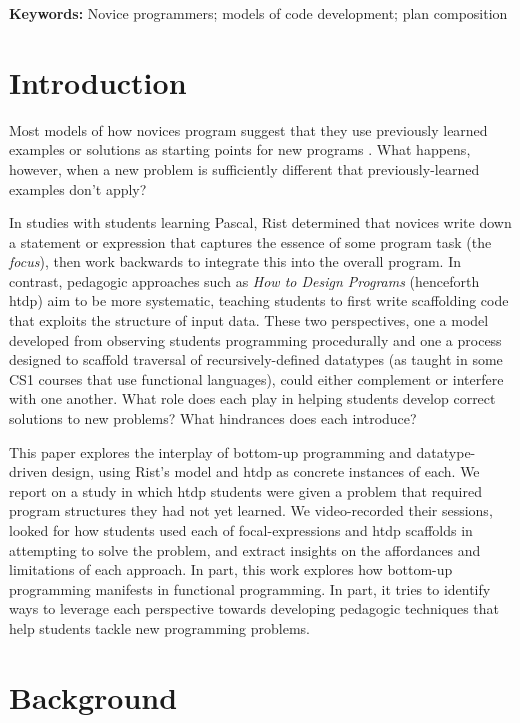 \documentclass{sig-alternate-05-2015}
\newcommand{\htdp}{{\sc htdp}\xspace}
\begin{document}
\vspace{1mm}
\noindent
{\bf Keywords:} Novice programmers; models of code development; plan composition

\section{Introduction}

Most models of how novices program suggest that they use previously learned examples or solutions as starting points for new programs \cite{Pirolli_Anderson_1985,  Pirolli_Anderson_Farrell_1984, Spohrer_Soloway_1989}. What happens, however, when a new problem is sufficiently different that previously-learned examples don't apply? 

In studies with students learning Pascal, Rist \cite{Rist_1989, Rist_1991} determined that novices write down a statement or expression that captures the essence of some program task (the \textit{focus}), then work backwards to integrate this into the overall program.  In contrast, pedagogic approaches such as \textit{How to Design Programs} (henceforth \htdp) aim to be more systematic, teaching students to first write scaffolding code that exploits the structure of input data.  These two perspectives, one a model developed from observing students programming procedurally and one a process designed to scaffold traversal of recursively-defined datatypes (as taught in some CS1 courses that use functional languages), could either complement or interfere with one another.  What role does each play in helping students develop correct solutions to new problems?  What hindrances does each introduce?

This paper explores the interplay of bottom-up programming and datatype-driven design, using Rist's model and \htdp as concrete instances of each.  We report on a study in which \htdp students were given a problem that required program structures they had not yet learned. We video-recorded their sessions, looked for how students used each of focal-expressions and \htdp scaffolds in attempting to solve the problem, and extract insights on the affordances and limitations of each approach.  In part, this work explores how bottom-up programming manifests in functional programming.  In part, it tries to identify ways to leverage each  perspective towards developing pedagogic techniques that help students tackle new programming problems.

\section{Background}
\end{document}
